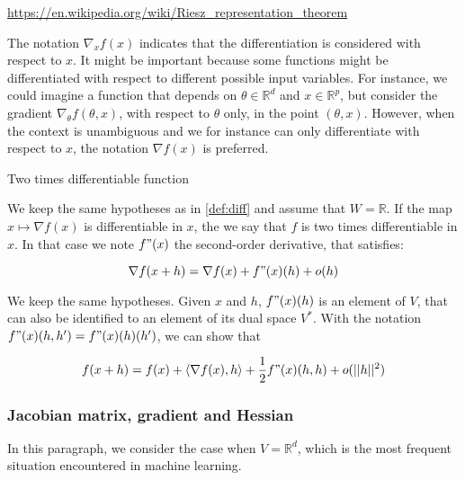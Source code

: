 \documentclass[
10pt, %
a4paper, %
oneside, %
headinclude,footinclude, %
BCOR5mm, %
]{scrartcl}
\begin{document}
\url{https://en.wikipedia.org/wiki/Riesz_representation_theorem} 

\begin{remark}
    The notation $\nabla_x f(x)$ indicates that the differentiation is considered with respect to $x$. It might be important because some functions might be differentiated with respect to different possible input variables. For instance, we could imagine a function that depends on $\theta \in \mathbb{R}^d$ and $x\in \mathbb{R}^p$, but consider the gradient $\nabla_{\theta}f(\theta, x)$, with respect to $\theta$ only, in the point $(\theta, x)$. However, when the context is unambiguous and we for instance can only differentiate with respect to $x$, the notation $\nabla f(x)$ is preferred.
\end{remark}

\begin{definition}{Two times differentiable function}
    \label{def:twodiff}

    We keep the same hypotheses as in \ref{def:diff} and assume that $W= \mathbb{R}$. If the map $x\mapsto \nabla f(x) $ is differentiable in $x$, the we say that $f$ is two times differentiable in $x$. In that case we note $f"(x)$ the second-order derivative, that satisfies:

    \begin{equation}
	\nabla f(x+h)=\nabla f(x)+f"(x)(h)+o(h)
    \end{equation}
\end{definition}

\begin{lemma}
    We keep the same hypotheses. Given $x$ and $h$, $f"(x)(h)$ is an element of $V$, that can also be identified to an element of its dual space $V^*$. With the notation $f"(x)(h, h')=f"(x)(h)(h')$, we can show that

    \begin{equation}
	f(x+h)=f(x)+\langle\nabla f(x),h\rangle+ \frac{1}{2} f"(x)(h,h)+o(||h||^2)        
    \end{equation}
\end{lemma}

\subsubsection{\large\color{Periwinkle}Jacobian matrix, gradient and Hessian}

In this paragraph, we consider the case when $V= \mathbb{R}^d$, which is the most frequent situation encountered in machine learning.
\\
\end{document}
